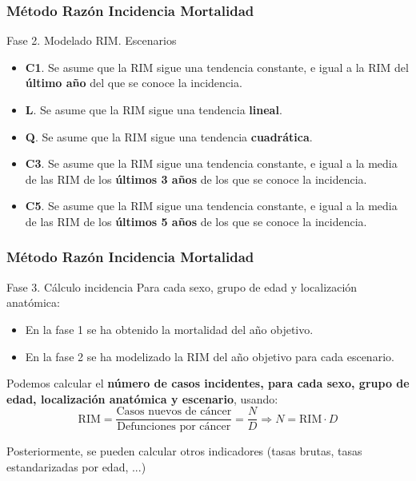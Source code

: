 \documentclass{beamer}
\begin{document}

\begin{frame}\frametitle{Método Razón Incidencia Mortalidad}

	\begin{block}{Fase 2. Modelado RIM. Escenarios}
		\begin{itemize}
			\item \textbf{C1}. Se asume que la RIM sigue una tendencia constante, e igual a la RIM del \textbf{último año} del que se conoce la incidencia.\\[2ex]
			\item \textbf{L}. Se asume que la RIM sigue una tendencia \textbf{lineal}.\\[2ex]
			\item \textbf{Q}. Se asume que la RIM sigue una tendencia \textbf{cuadrática}.\\[2ex]
			\pause
			\item \textbf{C3}. Se asume que la RIM sigue una tendencia constante, e igual a la media de las RIM de los \textbf{últimos 3 años} de los que se conoce la incidencia.\\[2ex]
			\item \textbf{C5}. Se asume que la RIM sigue una tendencia constante, e igual a la media de las RIM de los \textbf{últimos 5 años} de los que se conoce la incidencia.\\[2ex]
		\end{itemize}
	\end{block}

\end{frame}


\begin{frame}\frametitle{Método Razón Incidencia Mortalidad}

	\begin{block}{Fase 3. Cálculo incidencia}
		Para cada sexo, grupo de edad y localización anatómica:
		\begin{itemize}
			\item En la fase 1 se ha obtenido la mortalidad del año objetivo. \\[2ex]
			\item En la fase 2 se ha modelizado la RIM del año objetivo para cada escenario.\\[2ex]
		\end{itemize}		
		
		Podemos calcular el \textbf{número de casos incidentes, para cada sexo, grupo de edad, localización anatómica y escenario}, usando:\\
		
		$$\text{RIM} = \dfrac{\text{Casos nuevos de cáncer}}{\text{Defunciones por cáncer}} = \dfrac{N}{D} \Rightarrow N  = \text{RIM} \cdot D $$
		
		Posteriormente, se pueden calcular otros indicadores (tasas brutas, tasas estandarizadas por edad, ...)
	\end{block}

\end{frame}
\end{document}
